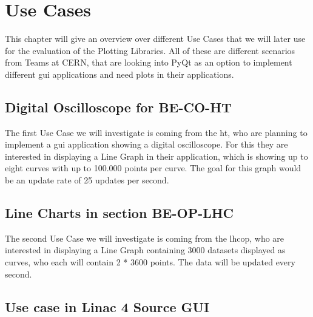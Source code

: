 
\chapter{Use Cases}
\label{ch:usecases}

This chapter will give an overview over different Use Cases that we will later use for the evaluation of the Plotting Libraries. All of these are different scenarios from Teams at CERN, that are looking into PyQt as an option to implement different \gls{gui} applications and need plots in their applications.




\section{Digital Oscilloscope for BE-CO-HT}
\label{sec:usecases:becoht}

The first Use Case we will investigate is coming from the \gls{ht}, who are planning to implement a \gls{gui} application showing a digital oscilloscope. For this they are interested in displaying a Line Graph in their application, which is showing up to eight curves with up to 100.000 points per curve. The goal for this graph would be an update rate of 25 updates per second.




\section{Line Charts in section BE-OP-LHC}
\label{sec:usecases:becolhc}

The second Use Case we will investigate is coming from the \gls{lhcop}, who are interested in displaying a Line Graph containing 3000 datasets displayed as curves, who each will contain 2 * 3600 points. The data will be updated every second.


\section{Use case in Linac 4 Source GUI}
\label{sec:usecases:linac}

